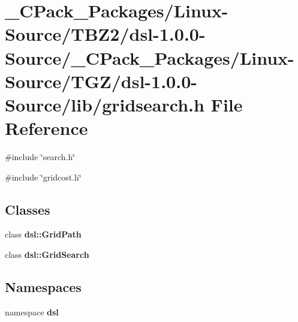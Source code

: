 \section{\_\-CPack\_\-Packages/Linux-\/Source/TBZ2/dsl-\/1.0.0-\/Source/\_\-CPack\_\-Packages/Linux-\/Source/TGZ/dsl-\/1.0.0-\/Source/lib/gridsearch.h File Reference}
\label{__CPack__Packages_2Linux-Source_2TBZ2_2dsl-1_80_80-Source_2__CPack__Packages_2Linux-Source_2TGZ_aa3ed11fe7629860195021d20f326a3d}
{\ttfamily \#include \char`\"{}search.h\char`\"{}}\par
{\ttfamily \#include \char`\"{}gridcost.h\char`\"{}}\par
\subsection*{Classes}
\begin{DoxyCompactItemize}
\item 
class {\bf dsl::GridPath}
\item 
class {\bf dsl::GridSearch}
\end{DoxyCompactItemize}
\subsection*{Namespaces}
\begin{DoxyCompactItemize}
\item 
namespace {\bf dsl}
\end{DoxyCompactItemize}
